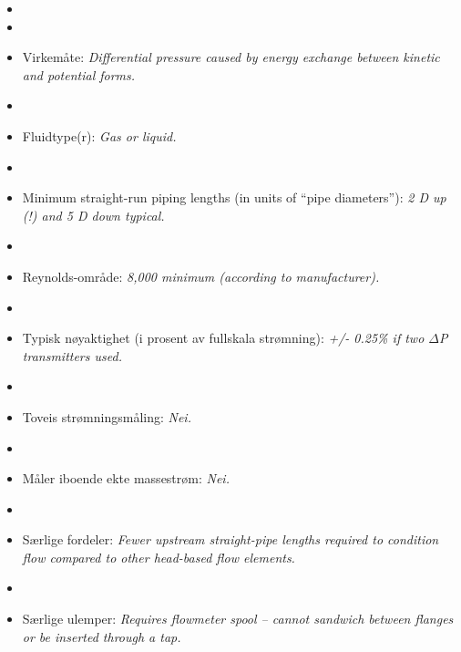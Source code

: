 \begin{itemize}
\goodbreak
\item{} 
\vskip 5pt
\item\item{} Virkemåte: {\it Differential pressure caused by energy exchange between kinetic and potential forms.}
\vskip 5pt
\item\item{} Fluidtype(r): {\it Gas or liquid.}
\vskip 5pt
\item\item{} Minimum straight-run piping lengths (in units of ``pipe diameters''): {\it 2 D up (!) and 5 D down typical.}
\vskip 5pt
\item\item{} Reynolds-område: {\it 8,000 minimum (according to manufacturer).}
\vskip 5pt
\item\item{} Typisk nøyaktighet (i prosent av fullskala strømning): {\it +/- 0.25\% if two $\Delta$P transmitters used.}
\vskip 5pt
\item\item{} Toveis strømningsmåling: {\it Nei.}
\vskip 5pt
\item\item{} Måler iboende ekte massestrøm: {\it Nei.}
\vskip 5pt
\item\item{} Særlige fordeler: {\it Fewer upstream straight-pipe lengths required to condition flow compared to other head-based flow elements.}
\vskip 5pt
\item\item{} Særlige ulemper: {\it Requires flowmeter spool -- cannot sandwich between flanges or be inserted through a tap.}
\end{itemize}


